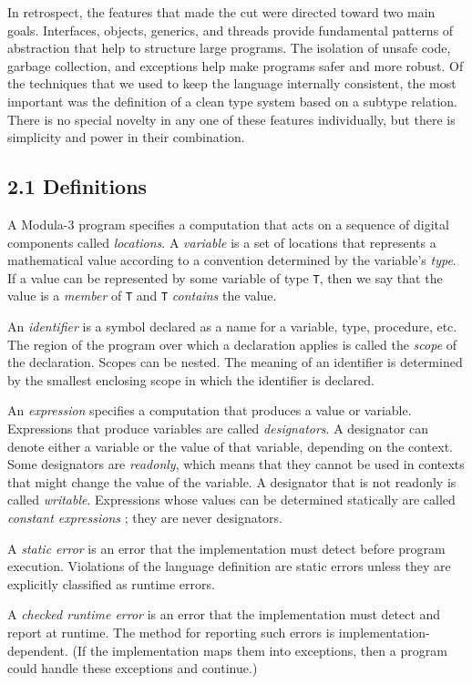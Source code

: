 \documentclass[10pt]{article}
\begin{document}
In retrospect, the features that made the cut were directed toward two main
goals.  Interfaces, objects, generics, and threads provide fundamental
patterns of abstraction that help to structure large programs.  The isolation
of unsafe code, garbage collection, and exceptions help make programs safer
and more robust.  Of the techniques that we used to keep the language
internally consistent, the most important was the definition of a clean type
system based on a subtype relation.  There is no special novelty in any one of
these features individually, but there is simplicity and power in their
combination.

\subsection*{2.1 Definitions}

A Modula-3 program specifies a computation that acts on a sequence of digital
components called \emph{locations}.  A \emph{variable} is a set of locations
that represents a mathematical value according to a convention determined by
the variable's \emph{type}.  If a value can be represented by some variable of
type \verb|T|, then we say that the value is a \emph{member} of \verb|T| and
\verb|T| \emph{contains} the value.

An \emph{identifier} is a symbol declared as a name for a variable, type,
procedure, etc.  The region of the program over which a declaration applies is
called the \emph{scope} of the declaration.  Scopes can be nested.  The
meaning of an identifier is determined by the smallest enclosing scope in
which the identifier is declared.

An \emph{expression} specifies a computation that produces a value or
variable.  Expressions that produce variables are called \emph{designators}.
A designator can denote either a variable or the value of that variable,
depending on the context.  Some designators are \emph{readonly}, which means
that they cannot be used in contexts that might change the value of the
variable.  A designator that is not readonly is called \emph{writable}.
Expressions whose values can be determined statically are called
\emph{constant expressions} ; they are never designators.

A \emph{static error} is an error that the implementation must detect before
program execution.  Violations of the language definition are static errors
unless they are explicitly classified as runtime errors.

A \emph{checked runtime error} is an error that the implementation must detect
and report at runtime.  The method for reporting such errors is
implementation-dependent.  (If the implementation maps them into exceptions,
then a program could handle these exceptions and continue.)
\end{document}
